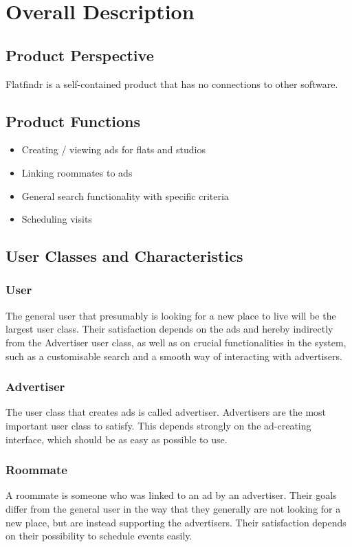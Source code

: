 \section{Overall Description}
\subsection{Product Perspective}
	Flatfindr is a self-contained product that has no connections to other software.	

\subsection{Product Functions}
\begin{itemize}
	\item Creating / viewing ads for flats and studios
	\item Linking roommates to ads
	\item General search functionality with specific criteria
	\item Scheduling visits
	\end{itemize}

\subsection{User Classes and Characteristics}
	\subsubsection{User}
		The general user that presumably is looking for a new place to live will be the largest 
		user class. Their satisfaction depends on the ads and hereby indirectly from the Advertiser 
		user class, as well as on crucial functionalities in the system, such as a customisable 
		search and a smooth way of interacting with advertisers.

	\subsubsection{Advertiser}
		The user class that creates ads is called advertiser. Advertisers are the most important 
		user class to satisfy. This depends strongly on the ad-creating interface, which should be 
		as easy as possible to use. 

	\subsubsection{Roommate}
		A roommate is someone who was linked to an ad by an advertiser. Their goals differ from 
		the general user in the way that they generally are not looking for a new place, but are 
		instead supporting the advertisers. Their satisfaction depends on their possibility to 
		schedule events easily.
	
